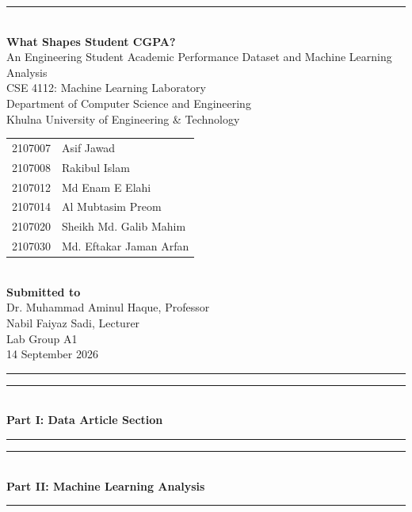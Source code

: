 \documentclass[11pt,a4paper]{article}
\newcommand{\partbanner}[1]{\clearpage\thispagestyle{empty}\vspace*{0.28\textheight}\begin{center}\color{navy}\rule{0.75\linewidth}{1.2pt}\\[12pt]{\Huge\bfseries #1}\\[12pt]\rule{0.75\linewidth}{1.2pt}\end{center}\clearpage}
\begin{document}
\begin{titlepage}
\centering
\vspace*{16mm}
{\color{navy}\rule{\textwidth}{1.5pt}}\\[12mm]
{\Huge\bfseries What Shapes Student CGPA?\\[4mm]}
{\LARGE An Engineering Student Academic Performance Dataset and Machine Learning Analysis}
\\[11mm]
{\Large CSE 4112: Machine Learning Laboratory}\\[4mm]
{\large Department of Computer Science and Engineering\\Khulna University of Engineering \& Technology}
\\[12mm]
\begin{tabular}{rl}
2107007 & Asif Jawad\\
2107008 & Rakibul Islam\\
2107012 & Md Enam E Elahi\\
2107014 & Al Mubtasim Preom\\
2107020 & Sheikh Md. Galib Mahim\\
2107030 & Md. Eftakar Jaman Arfan
\end{tabular}
\\[12mm]
\textbf{Submitted to}\\
Dr. Muhammad Aminul Haque, Professor\\
Nabil Faiyaz Sadi, Lecturer\\[8mm]
Lab Group A1\\[3mm]
14 September 2026
\vfill
{\color{navy}\rule{\textwidth}{1.5pt}}
\end{titlepage}


\tableofcontents
\listoffigures
\listoftables
\clearpage
{}

\partbanner{Part I: Data Article Section}







\partbanner{Part II: Machine Learning Analysis}







\printbibliography[title={References}]
\appendix
\end{document}
